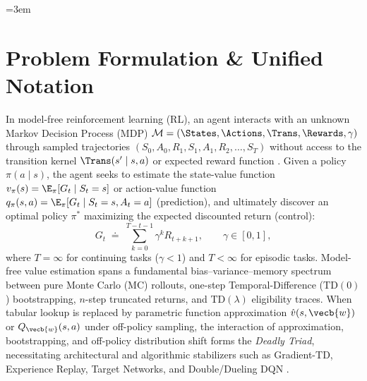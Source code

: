 \documentclass[../../../../master.tex]{subfiles}
\begin{document}
\begingroup\sloppy\emergencystretch=3em


\section{Problem Formulation \& Unified Notation}
\label{sec:td:formulation}

In model-free reinforcement learning (RL), an agent interacts with an unknown Markov Decision Process (MDP) $\mathcal{M} = (\States, \Actions, \Trans, \Rewards, \gamma)$ through sampled trajectories $(S_0, A_0, R_1, S_1, A_1, R_2, \dots, S_T)$ without access to the transition kernel $\Trans(s' \mid s, a)$ or expected reward function  . Given a policy $\pi(a \mid s)$, the agent seeks to estimate the state-value function $v_\pi(s) = \E_\pi[G_t \mid S_t = s]$ or action-value function $q_\pi(s, a) = \E_\pi[G_t \mid S_t = s, A_t = a]$ (prediction), and ultimately discover an optimal policy $\pi^*$ maximizing the expected discounted return (control):
\begin{equation}
  G_t \;\doteq\; \sum_{k=0}^{T - t - 1} \gamma^k R_{t+k+1}, \qquad \gamma \in [0, 1],
  \label{eq:td:mc_return}
\end{equation}
where $T = \infty$ for continuing tasks ($\gamma < 1$) and $T < \infty$ for episodic tasks. Model-free value estimation spans a fundamental bias--variance--memory spectrum between pure Monte Carlo (MC) rollouts, one-step Temporal-Difference ($\mathrm{TD}(0)$) bootstrapping, $n$-step truncated returns, and $\mathrm{TD}(\lambda)$ eligibility traces. When tabular lookup is replaced by parametric function approximation $\hat{v}(s, \vecb{w})$ or $Q_{\vecb{w}}(s, a)$ under off-policy sampling, the interaction of approximation, bootstrapping, and off-policy distribution shift forms the \emph{Deadly Triad}, necessitating architectural and algorithmic stabilizers such as Gradient-TD, Experience Replay, Target Networks, and Double/Dueling DQN  .
\end{document}
